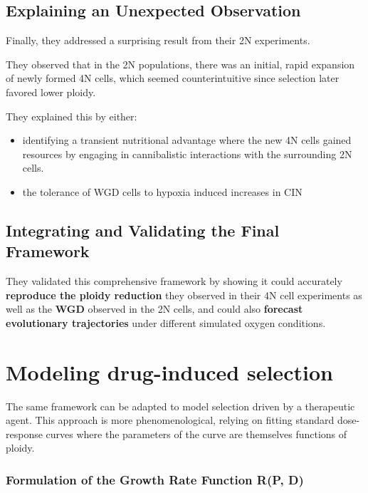 \documentclass{article}
\begin{document}
\subsection{Explaining an Unexpected Observation}
Finally, they addressed a surprising result from their 2N experiments.

They observed that in the 2N populations, there was an initial, rapid expansion of newly formed 4N cells, which seemed counterintuitive since selection later favored lower ploidy.

They explained this by either:
\color{blue}
\begin{itemize}
    \item identifying a transient nutritional advantage where the new 4N cells gained resources by engaging in cannibalistic interactions with the surrounding 2N cells.
    \item the tolerance of WGD cells to hypoxia induced increases in CIN
\end{itemize}
\color{black}

\subsection{Integrating and Validating the Final Framework}
\color{blue}
 They validated this comprehensive framework by showing it could accurately \textbf{reproduce the ploidy reduction} they observed in their 4N cell experiments as well as the \textbf{WGD} observed in the 2N cells, and could also \textbf{forecast evolutionary trajectories} under different simulated oxygen conditions.
\color{black}



\section{Modeling drug-induced selection }
The same framework can be adapted to model selection driven by a therapeutic agent. This approach is more phenomenological, relying on fitting standard dose-response curves where the parameters of the curve are themselves functions of ploidy.

\subsubsection*{Formulation of the Growth Rate Function R(P, D)}
\end{document}
